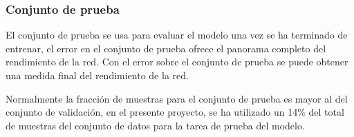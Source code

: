         \subsubsection{Conjunto de prueba}
        El conjunto de prueba se usa para evaluar el modelo una vez se ha terminado de entrenar, el error en el conjunto de 
        prueba ofrece el panorama completo del rendimiento de la red. Con el error sobre el conjunto de prueba se puede obtener 
        una medida final del rendimiento de la red. 

        Normalmente la fracción de muestras para el conjunto de prueba es mayor al del conjunto de validación, en el 
        presente proyecto, se ha utilizado un 14\% del total de muestras del conjunto de datos para la tarea de 
        prueba del modelo.



